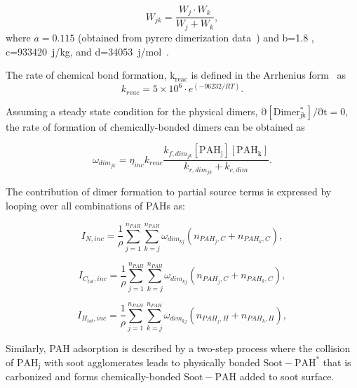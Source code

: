 \begin{equation}
	W_{jk} = \frac{W_j\cdot W_k}{W_j+W_k}
	\label{eqn:Wjk_reacdim},
\end{equation}
\noindent where ${a=0.115}$ (obtained from pyrere dimerization data~\cite{sabbah2010exploring}) and b=1.8 \cite{kholghy2018reactive}, c=933420~j/kg, and d=34053~j/mol~\cite{kholghy2018reactive}. 

The rate of chemical bond formation, $\mathrm{k_{reac}}$ is defined in the Arrhenius form~\cite{naseri2022simulating} as
\begin{equation}
	k_{reac} = 5\times10^6\cdot e^{(-96232/RT)}
	\label{eqn:kc_reacdim}.
\end{equation}

Assuming a steady state condition for the physical dimers, $\mathrm{\partial [Dimer^*_{jk}]/\partial t=0}$, the rate of formation of chemically-bonded dimers can be obtained as

\begin{equation}
	\omega_{dim_{jk}} = \eta_{inc} k_{reac}\frac{k_{f,dim_{jk}}[\mathrm{PAH_j}][\mathrm{PAH_k}]}
	{k_{r,dim_{jk}}+k_{c,dim}}
	\label{eqn:chemdimer_reacdim}.
\end{equation}

The contribution of dimer formation to partial source terms is expressed by looping over all combinations of PAHs as:

\begin{equation}
	I_{N,{inc}} = 
	\frac{1}{\rho}
	\sum_{j=1}^{n_{PAH}} \sum_{k=j}^{n_{PAH}}  \omega_{dim_{kj}} 
	\left(
	n_{PAH_j,C}+n_{PAH_k,C}
	\right)
	\label{eqn:IN_inc},
\end{equation}

\begin{equation}
	I_{C_{tot},{inc}} = 
	\frac{1}{\rho}
	\sum_{j=1}^{n_{PAH}} \sum_{k=j}^{n_{PAH}}  \omega_{dim_{kj}} 
	\left(
	n_{PAH_j,C}+n_{PAH_k,C}
	\right)
	\label{eqn:ICtot_inc},
\end{equation}

\begin{equation}
	I_{H_{tot},{inc}} = 
	\frac{1}{\rho}
	\sum_{j=1}^{n_{PAH}} \sum_{k=j}^{n_{PAH}}  \omega_{dim_{kj}} 
	\left(
	n_{PAH_j,H}+n_{PAH_k,H}
	\right)
	\label{eqn:IHtot_inc},
\end{equation}

Similarly, PAH adsorption is described by a two-step process where the collision of $\mathrm{PAH_j}$ with soot agglomerates leads to physically bonded $\mathrm{Soot-PAH^*}$ that is carbonized and forms chemically-bonded $\mathrm{Soot-PAH}$ added to soot surface.


